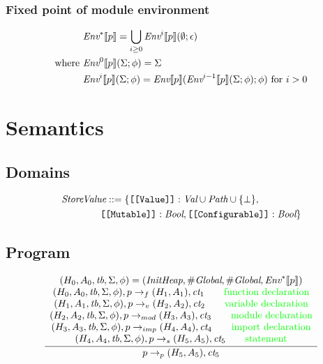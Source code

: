 \documentclass[a4paper]{article}
\newcommand{\comment}[1]{\mbox{\textcolor{green}{#1}}}
\newcommand{\Env}{\emph{Env}}
\newcommand{\Where}{\mbox{where}}
\newcommand{\tb}{\emph{tb}}
\newcommand{\ct}{\emph{ct}}
\begin{document}
\subsubsection{Fixed point of module environment}

\begin{equation*}
\begin{split}
& \Env^* \llbracket p \rrbracket = \bigcup_{i \ge 0} \Env^i \llbracket p \rrbracket (\emptyset; \epsilon) \\
\Where\ & \Env^0 \llbracket p \rrbracket (\Sigma; \phi) = \Sigma \\
& \Env^i \llbracket p \rrbracket (\Sigma; \phi) = \Env \llbracket p \rrbracket (\Env^{i-1} \llbracket p \rrbracket (\Sigma; \phi); \phi)\ \mbox{for}\ i > 0 \\
\end{split}
\end{equation*}

\section{Semantics}

\subsection{Domains}

\begin{equation*}
\begin{split}
& \emph{StoreValue} ::= \{ \texttt{[[Value]]} : \emph{Val} \cup \emph{Path} \cup \{ \bot \}, \\
&\qquad\qquad \texttt{[[Mutable]]} : \emph{Bool}, \texttt{[[Configurable]]} : \emph{Bool} \}
\end{split}
\end{equation*}

\subsection{Program}

\begin{equation*}
\frac{
    \begin{array}{c}
    (H_0, A_0, \tb, \Sigma, \phi) = (\emph{InitHeap}, \#\emph{Global}, \#\emph{Global}, \Env^* \llbracket p \rrbracket) \\
    (H_0, A_0, \tb, \Sigma, \phi), p \rightarrow_f (H_1, A_1), \ct_1 \qquad \comment{function declaration} \\
    (H_1, A_1, \tb, \Sigma, \phi), p \rightarrow_v (H_2, A_2), \ct_2 \qquad \comment{variable declaration} \\
    (H_2, A_2, \tb, \Sigma, \phi), p \rightarrow_{mod} (H_3, A_3), \ct_3 \qquad \comment{module declaration} \\
    (H_3, A_3, \tb, \Sigma, \phi), p \rightarrow_{imp} (H_4, A_4), \ct_4 \qquad \comment{import declaration} \\
    (H_4, A_4, \tb, \Sigma, \phi), p \rightarrow_s (H_5, A_5), \ct_5 \qquad \comment{statement} \\
    \end{array}
}{
    p \rightarrow_p (H_5, A_5), \ct_5
}
\end{equation*}
\end{document}
